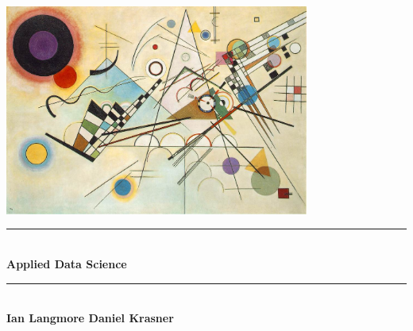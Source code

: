 \documentclass[11pt,openany]{book}
\newcommand{\HRule}{\noindent\rule{\linewidth}{0.5mm}}
\theoremstyle{theorem}
\theoremstyle{plain}
\theoremstyle{definition}
\theoremstyle{remark}
\begin{document}
\begin{titlepage}
\begin{center}

\includegraphics[width=0.75\textwidth]{../images/kandinsky}



\HRule \\[0.4cm]
{ \Huge \bfseries Applied Data Science}\\[0.4cm]

\HRule \\[1.5cm]

\vspace{2in}
{\LARGE \bfseries Ian Langmore \hfill Daniel Krasner}


\vfill



\end{center}
\end{titlepage}
\end{document}
